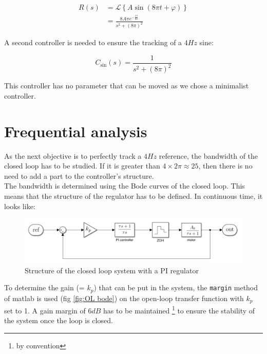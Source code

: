 \begin{align}
    R(s) &= \mathcal{L}\left\{A \sin (8 \pi t + \varphi)\right\} \\
    &= \frac{8 A \pi e^{-\frac{\varphi s}{8 \pi}}}{s^2 + (8\pi)^2}
\end{align}

A second controller is needed to ensure the tracking of a $4 Hz$ sine:

\begin{equation}
    C_{\sin}(s) = \frac{1}{s^2 + (8\pi)^2}
    \label{eq:controller_sin}
\end{equation}

This controller has no parameter that can be moved as we chose a minimalist controller. 
\fi

\section{Frequential analysis}
\label{section:freq_analysis}

As the next objective is to perfectly track a $4 Hz$ reference, the bandwidth of the closed loop has to be studied. If
it is greater than $4 \times 2\pi \approx 25$, then there is no need to add a part to the controller's structure.\\
The bandwidth is determined using the Bode curves of the closed loop. This means that the structure of the regulator
has to be defined. In continuous time, it looks like:

\begin{figure}[H]
    \centering
    \includegraphics[height=\textheight/7]{Pictures/controller_structure.png}
    \caption{Structure of the closed loop system with a PI regulator}
    \label{fig:CL structure}
\end{figure}

To determine the gain (= $k_p$) that can be put in the system, the \texttt{margin} method of matlab is used (fig 
\ref{fig:OL bode}) on the open-loop transfer function with $k_p$ set to 1. A gain margin of $6 dB$ has to be maintained 
\footnote{by convention} to ensure the stability of the system once the loop is closed. \\

